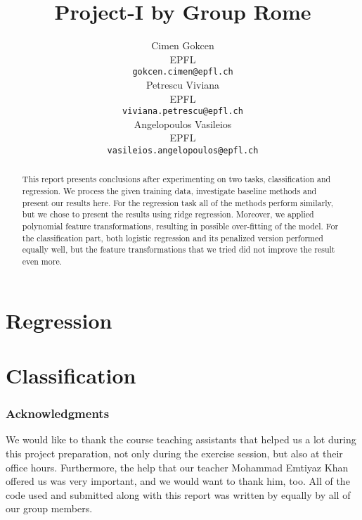 \documentclass{article} %
\title{Project-I by Group Rome}
\author{
Cimen Gokcen\\
EPFL \\
\texttt{gokcen.cimen@epfl.ch} \\
\And
Petrescu Viviana\\
EPFL \\
\texttt{viviana.petrescu@epfl.ch} \\
\And
Angelopoulos Vasileios \\
EPFL \\
\texttt{vasileios.angelopoulos@epfl.ch} \\
}
\begin{document}
\maketitle

\begin{abstract}
This report presents conclusions after experimenting on two tasks, classification and regression. We process the given training data, investigate baseline methods and present our results here. For the regression task all of the methods perform similarly, but we chose to present the results using ridge regression. Moreover, we applied polynomial feature transformations, resulting in possible over-fitting of the model. For the classification part, both logistic regression and its penalized version performed equally well, but the feature transformations that we tried did not improve the result even more.
\end{abstract}

\section{Regression}


\section{Classification}


\subsubsection*{Acknowledgments}
We would like to thank the course teaching assistants that helped us a lot during this project preparation, not only during the exercise session, but also at their office hours. Furthermore, the help that our teacher Mohammad Emtiyaz Khan offered us was very  important, and we would want to thank him, too. All of the code used and submitted along with this report was written by equally by all of our group members.
\end{document}

